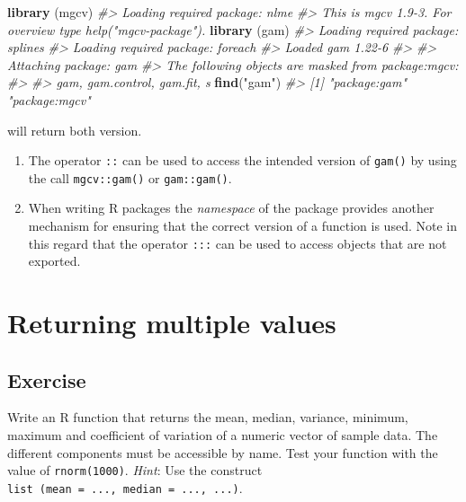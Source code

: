 \documentclass[
]{book}
\newenvironment{Shaded}{\begin{snugshade}}{\end{snugshade}}
\newcommand{\CommentTok}[1]{\textcolor[rgb]{0.56,0.35,0.01}{\textit{#1}}}
\newcommand{\FunctionTok}[1]{\textcolor[rgb]{0.13,0.29,0.53}{\textbf{#1}}}
\newcommand{\NormalTok}[1]{#1}
\newcommand{\StringTok}[1]{\textcolor[rgb]{0.31,0.60,0.02}{#1}}
\begin{document}
\begin{Shaded}
\begin{Highlighting}[]
\FunctionTok{library}\NormalTok{ (mgcv)}
\CommentTok{\#\textgreater{} Loading required package: nlme}
\CommentTok{\#\textgreater{} This is mgcv 1.9{-}3. For overview type \textquotesingle{}help("mgcv{-}package")\textquotesingle{}.}
\FunctionTok{library}\NormalTok{ (gam)}
\CommentTok{\#\textgreater{} Loading required package: splines}
\CommentTok{\#\textgreater{} Loading required package: foreach}
\CommentTok{\#\textgreater{} Loaded gam 1.22{-}6}
\CommentTok{\#\textgreater{} }
\CommentTok{\#\textgreater{} Attaching package: \textquotesingle{}gam\textquotesingle{}}
\CommentTok{\#\textgreater{} The following objects are masked from \textquotesingle{}package:mgcv\textquotesingle{}:}
\CommentTok{\#\textgreater{} }
\CommentTok{\#\textgreater{}     gam, gam.control, gam.fit, s}
\FunctionTok{find}\NormalTok{(}\StringTok{"gam"}\NormalTok{)}
\CommentTok{\#\textgreater{} [1] "package:gam"  "package:mgcv"}
\end{Highlighting}
\end{Shaded}

will return both version.

\begin{enumerate}
\def\labelenumi{(\alph{enumi})}
\setcounter{enumi}{3}
\item
  The operator \texttt{::} can be used to access the intended version of \texttt{gam()} by using the call \texttt{mgcv::gam()} or \texttt{gam::gam()}.
\item
  When writing R packages the \emph{{namespace}} of the package provides another mechanism for ensuring that the correct version of a function is used. Note in this regard that the operator \texttt{:::} can be used to access objects that are not exported.
\end{enumerate}

\section{Returning multiple values}\label{returning-multiple-values}

\subsection{Exercise}\label{exercise-12}

Write an R function that returns the mean, median, variance, minimum, maximum and coefficient of variation of a numeric vector of sample data. The different components must be accessible by name. Test your function with the value of \texttt{rnorm(1000)}. \emph{Hint}: Use the construct \texttt{list\ (mean\ =\ ...,\ median\ =\ ...,\ ...)}.
\end{document}
